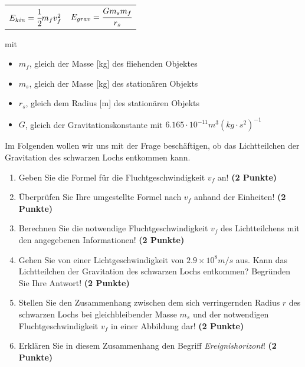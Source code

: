 \documentclass[a4paper, 9pt]{scrartcl}\usepackage[]{graphicx}\usepackage[]{xcolor}
\begin{document}
\begin{center}
  \begin{tabular}{cc}
    $E_{kin} = \cfrac{1}{2}m_fv_f^2$ & $E_{grav} = \cfrac{Gm_sm_f}{r_s}$\\
  \end{tabular}
\end{center}

mit

\begin{itemize}[noitemsep]
\item $m_f$, gleich der Masse [kg] des fliehenden Objektes
\item $m_s$, gleich der Masse [kg] des station{\"a}ren Objekts
\item $r_s$, gleich dem Radius [m] des station{\"a}ren Objekts  
\item $G$, gleich der Gravitationskonstante mit $6.165 \cdot 10^{-11}
  m^3(kg \cdot s^2)^{-1}$ 
\end{itemize}

Im Folgenden wollen wir uns mit der Frage besch{\"a}ftigen, ob das
Lichtteilchen der Gravitation des schwarzen Lochs entkommen kann.

\begin{enumerate}
\item Geben Sie die Formel f{\"u}r die Fluchtgeschwindigkeit $v_f$ an! 
  \textbf{(2 Punkte)}
\item {\"U}berpr{\"u}fen Sie Ihre umgestellte Formel nach $v_f$ anhand der Einheiten!
  \textbf{(2 Punkte)} 
\item Berechnen Sie die notwendige Fluchtgeschwindigkeit $v_f$ des
  Lichtteilchens mit den angegebenen Informationen! \textbf{(2 Punkte)}
\item Gehen Sie von einer Lichtgeschwindigkeit von $\ensuremath{2.9\times 10^{8}}m/s$
  aus. Kann das Lichtteilchen der Gravitation des schwarzen Lochs
  entkommen? Begr{\"u}nden Sie Ihre Antwort! \textbf{(2 Punkte)}
\item Stellen Sie den Zusammenhang zwischen dem sich verringernden Radius
  $r$ des schwarzen Lochs bei gleichbleibender Masse $m_s$
  und der notwendigen Fluchtgeschwindigkeit $v_f$ in einer Abbildung dar!
  \textbf{(2 Punkte)}
\item Erkl{\"a}ren Sie in diesem Zusammenhang den Begriff
  \textit{Ereignishorizont}! \textbf{(2 Punkte)} 
\end{enumerate}

 
\clearpage
\end{document}
